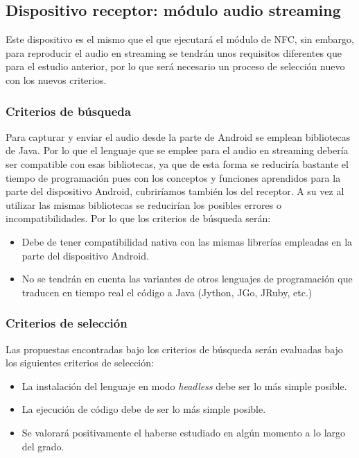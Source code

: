\subsection{Dispositivo receptor: módulo audio streaming}

Este dispositivo es el mismo que el que ejecutará el módulo de NFC, sin embargo,
para reproducir el audio en streaming se tendrán unos requisitos diferentes que
para el estudio anterior, por lo que será necesario un proceso de selección
nuevo con los nuevos criterios.

\subsubsection{Criterios de búsqueda}

Para capturar y enviar el audio desde la parte de Android se emplean bibliotecas
de Java. Por lo que el lenguaje que se emplee para el audio en streaming debería
ser compatible con esas bibliotecas, ya que de esta forma se reduciría bastante
el tiempo de programación pues con los conceptos y funciones aprendidos para la
parte del dispositivo Android, cubriríamos también los del receptor. A su vez al
utilizar las mismas bibliotecas se reducirían los posibles errores o
incompatibilidades. Por lo que los criterios de búsqueda serán:

\begin{itemize}
    \item Debe de tener compatibilidad nativa con las mismas librerías empleadas
    en la parte del dispositivo Android.
    \item No se tendrán en cuenta las variantes de otros lenguajes de
    programación que traducen en tiempo real el código a Java (Jython, JGo,
    JRuby, etc.)
\end{itemize}

\subsubsection{Criterios de selección}

Las propuestas encontradas bajo los criterios de búsqueda serán evaluadas bajo
los siguientes criterios de selección:

\begin{itemize}
    \item La instalación del lenguaje en modo \emph{headless} debe ser lo más simple posible.
    \item La ejecución de código debe de ser lo más simple posible.
    \item Se valorará positivamente el haberse estudiado en algún momento a lo largo del grado.
\end{itemize}

